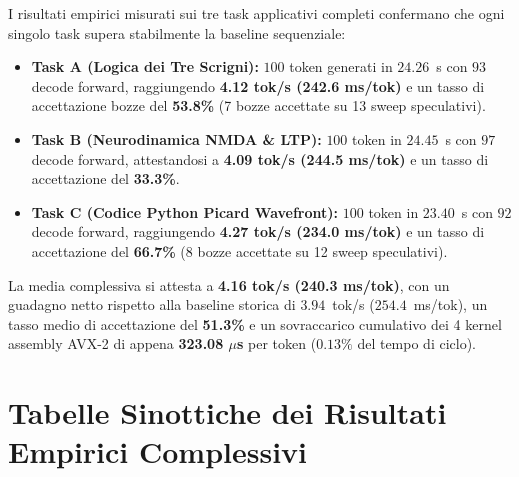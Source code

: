 \documentclass[10pt,a4paper]{article}
\theoremstyle{definition}
\begin{document}
I risultati empirici misurati sui tre task applicativi completi confermano che ogni singolo task supera stabilmente la baseline sequenziale:
\begin{itemize}[leftmargin=1.5em]
    \item \textbf{Task A (Logica dei Tre Scrigni):} $100$ token generati in $24.26$~s con $93$ decode forward, raggiungendo \textbf{4.12 tok/s (242.6 ms/tok)} e un tasso di accettazione bozze del \textbf{53.8\%} (7 bozze accettate su 13 sweep speculativi).
    \item \textbf{Task B (Neurodinamica NMDA \& LTP):} $100$ token in $24.45$~s con $97$ decode forward, attestandosi a \textbf{4.09 tok/s (244.5 ms/tok)} e un tasso di accettazione del \textbf{33.3\%}.
    \item \textbf{Task C (Codice Python Picard Wavefront):} $100$ token in $23.40$~s con $92$ decode forward, raggiungendo \textbf{4.27 tok/s (234.0 ms/tok)} e un tasso di accettazione del \textbf{66.7\%} (8 bozze accettate su 12 sweep speculativi).
\end{itemize}
La media complessiva si attesta a \textbf{4.16 tok/s (240.3 ms/tok)}, con un guadagno netto rispetto alla baseline storica di $3.94$~tok/s ($254.4$~ms/tok), un tasso medio di accettazione del \textbf{51.3\%} e un sovraccarico cumulativo dei 4 kernel assembly AVX-2 di appena \textbf{323.08 $\mu$s} per token ($0.13\%$ del tempo di ciclo).

\bigskip

\section{Tabelle Sinottiche dei Risultati Empirici Complessivi}
\end{document}
